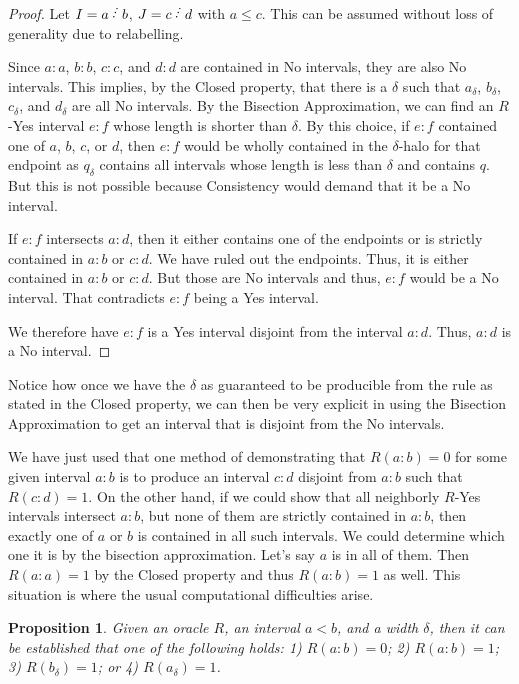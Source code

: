 \documentclass[12pt]{article}
\newtheorem{proposition}{Proposition}[subsection]
\begin{document}
\begin{proof}
    Let $I = a\lte b$, $J = c\lte d$ with $a \leq c$. This can be assumed without loss of generality due to relabelling. 
    
    Since $a:a$, $b:b$, $c:c$, and $d:d$ are contained in No intervals, they are also No intervals. This implies, by the Closed property, that there is a $\delta$ such that $a_\delta$, $b_\delta$, $c_\delta$, and $d_\delta$ are all No intervals. By the Bisection Approximation, we can find an $R$-Yes interval $e:f$ whose length is shorter than $\delta$. By this choice, if $e:f$ contained one of $a$, $b$, $c$, or $d$, then $e:f$ would be wholly contained in the $\delta$-halo for that endpoint as $q_\delta$ contains all intervals whose length is less than $\delta$ and contains $q$.  But this is not possible because Consistency would demand that it be a No interval.  
    
    If $e:f$ intersects $a:d$, then it either contains one of the endpoints or is strictly contained in $a:b$ or $c:d$. We have ruled out the endpoints. Thus, it is either contained in $a:b$ or $c:d$. But those are No intervals and thus, $e:f$ would be a No interval. That contradicts $e:f$ being a Yes interval. 

    We therefore have $e:f$ is a Yes interval disjoint from the interval $a:d$. Thus, $a:d$ is a No interval. 

\end{proof}

Notice how once we have the $\delta$ as guaranteed to be producible from the rule as stated in the Closed property, we can then be very explicit in using the Bisection Approximation to get an interval that is disjoint from the No intervals. 


We have just used that one method of demonstrating that $R(a:b)=0$ for some given interval $a:b$ is to produce an interval $c:d$ disjoint from $a:b$ such that $R(c:d)=1$. On the other hand, if we could show that all neighborly $R$-Yes intervals intersect $a:b$, but none of them are strictly contained in $a:b$, then exactly one of $a$ or $b$ is contained in all such intervals. We could determine which one it is by the bisection approximation. Let's say $a$ is in all of them. Then $R(a:a)=1$ by the Closed property and thus $R(a:b)=1$ as well. This situation is where the usual computational difficulties arise. 

\begin{proposition}\label{pr:down-to-one-halo}
    Given an oracle $R$, an interval $a \lt b$, and a width $\delta$, then it can be established that one of the following holds: 1) $R(a : b)=0$; 2) $R(a : b) = 1$; 3) $R(b_\delta) = 1$; or 4) $R(a_\delta)=1$.
\end{proposition}
\end{document}
